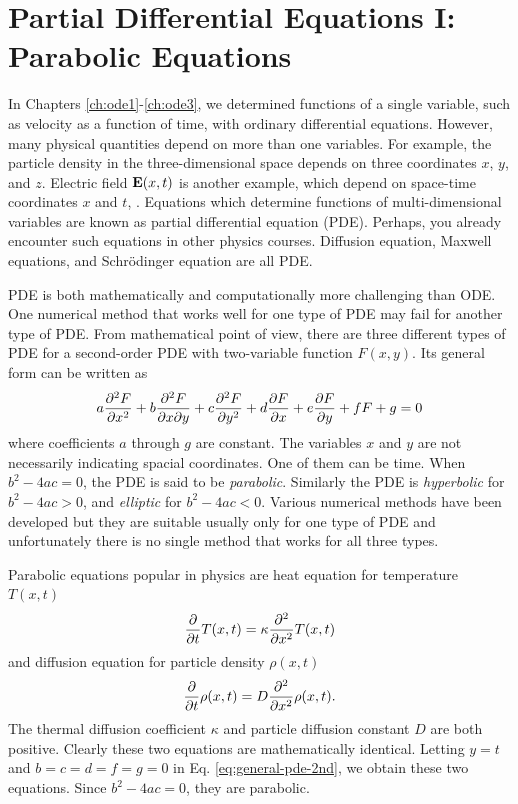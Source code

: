 \chapter{Partial Differential Equations I: Parabolic Equations}\label{ch:pde-parabolic}

In Chapters \ref{ch:ode1}-\ref{ch:ode3}, we determined functions of a single variable, such as velocity as a function of time, with ordinary differential equations.  However, many physical quantities depend on more than one variables. For example, the particle density in the three-dimensional space depends on three coordinates $x$, $y$, and $z$. Electric field $\vb{E}(x,t)$ is another example, which depend on space-time coordinates $x$ and $t$, .  Equations which determine functions of multi-dimensional variables are known as partial differential equation (PDE).  Perhaps, you already encounter such equations in other physics courses.  Diffusion equation, Maxwell equations, and Schr\"{o}dinger equation are all PDE.

PDE is both mathematically and computationally more challenging than ODE.  One numerical method that works well for one type of PDE may fail for another type of PDE. From mathematical point of view, there are three different types of PDE for a second-order PDE with two-variable function $F(x,y)$.  Its general form can be written as
\begin{equation}\label{eq:general-pde-2nd}
	a \pdv[2]{F}{x}+ b \pdv{F}{x}{y} + c \pdv[2]{F}{y} + d \pdv{F}{x} + e \pdv{F}{y} + f F + g = 0
\end{equation}
where coefficients $a$ through $g$ are constant.  The variables $x$ and $y$ are not necessarily indicating spacial coordinates.  One of them can be time. When $b^2-4 a c = 0$, the PDE is said to be \textit{parabolic}.  Similarly the PDE is \textit{hyperbolic} for $b^2 - 4 a c>0$, and \textit{elliptic} for $b^2-4 a c <0$.   Various numerical methods have been developed but they are suitable usually only for one type of PDE and unfortunately there is no single method that works for all three types.

Parabolic equations popular in physics are heat equation for temperature $T(x,t)$
\begin{equation}\label{eq:heat-eq}
	\pdv{t} T(x,t) = \kappa \pdv[2]{x} T(x,t)
\end{equation}
and diffusion equation for particle density $\rho(x,t)$
\begin{equation}\label{eq:diffusion}
	\pdv{t} \rho(x,t) = D \pdv[2]{x} \rho(x,t). 
\end{equation}
The thermal diffusion coefficient $\kappa$ and particle diffusion constant $D$ are both positive. Clearly these two equations are mathematically identical. Letting $y=t$ and $b=c=d=f=g=0$ in Eq. \eqref{eq:general-pde-2nd}, we obtain these two equations.   Since $b^2-4 a c=0$, they are parabolic.  

